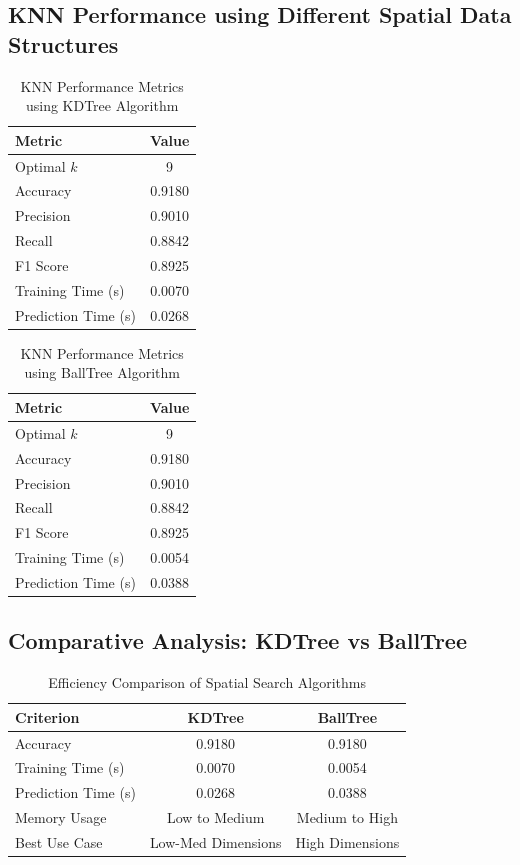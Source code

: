 \documentclass[11pt]{article}
\begin{document}
\subsection*{KNN Performance using Different Spatial Data Structures}

\begin{table}[H]
\centering
\renewcommand{\arraystretch}{1.3}
\caption{KNN Performance Metrics using KDTree Algorithm}
\begin{tabular}{|l|c|}
\hline
Metric & Value \\
\hline
Optimal $k$ & 9 \\
Accuracy & 0.9180 \\
Precision & 0.9010 \\
Recall & 0.8842 \\
F1 Score & 0.8925 \\
Training Time (s) & 0.0070 \\
Prediction Time (s) & 0.0268 \\
\hline
\end{tabular}
\end{table}

\begin{table}[H]
\centering
\renewcommand{\arraystretch}{1.3}
\caption{KNN Performance Metrics using BallTree Algorithm}
\begin{tabular}{|l|c|}
\hline
Metric & Value \\
\hline
Optimal $k$ & 9 \\
Accuracy & 0.9180 \\
Precision & 0.9010 \\
Recall & 0.8842 \\
F1 Score & 0.8925 \\
Training Time (s) & 0.0054 \\
Prediction Time (s) & 0.0388 \\
\hline
\end{tabular}
\end{table}

\subsection*{Comparative Analysis: KDTree vs BallTree}
\begin{table}[H]
\centering
\renewcommand{\arraystretch}{1.3}
\caption{Efficiency Comparison of Spatial Search Algorithms}
\begin{tabular}{|l|c|c|}
\hline
Criterion & KDTree & BallTree \\
\hline
Accuracy & 0.9180 & 0.9180 \\
Training Time (s) & 0.0070 & 0.0054 \\
Prediction Time (s) & 0.0268 & 0.0388 \\
Memory Usage & Low to Medium & Medium to High \\
Best Use Case & Low-Med Dimensions & High Dimensions \\
\hline
\end{tabular}
\end{table}
\end{document}

